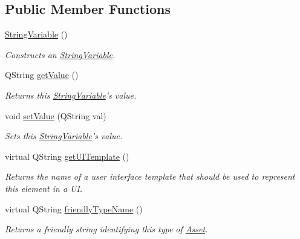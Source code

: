 \subsection*{Public Member Functions}
\begin{DoxyCompactItemize}
\item 
\hyperlink{class_picto_1_1_string_variable_a443c07562e5e21f5c1d72b5c5330303f}{String\-Variable} ()
\begin{DoxyCompactList}\small\item\em Constructs an \hyperlink{class_picto_1_1_string_variable}{String\-Variable}. \end{DoxyCompactList}\item 
\hypertarget{class_picto_1_1_string_variable_a533cc8e5eb63b0ea89f22e5e94f9f4ac}{Q\-String \hyperlink{class_picto_1_1_string_variable_a533cc8e5eb63b0ea89f22e5e94f9f4ac}{get\-Value} ()}\label{class_picto_1_1_string_variable_a533cc8e5eb63b0ea89f22e5e94f9f4ac}

\begin{DoxyCompactList}\small\item\em Returns this \hyperlink{class_picto_1_1_string_variable}{String\-Variable}'s value. \end{DoxyCompactList}\item 
\hypertarget{class_picto_1_1_string_variable_a0090c005a83026e90647fd27a6fb53f4}{void \hyperlink{class_picto_1_1_string_variable_a0090c005a83026e90647fd27a6fb53f4}{set\-Value} (Q\-String val)}\label{class_picto_1_1_string_variable_a0090c005a83026e90647fd27a6fb53f4}

\begin{DoxyCompactList}\small\item\em Sets this \hyperlink{class_picto_1_1_string_variable}{String\-Variable}'s value. \end{DoxyCompactList}\item 
\hypertarget{class_picto_1_1_string_variable_ad1f985a43f87f78dc92216cf03ffeadc}{virtual Q\-String \hyperlink{class_picto_1_1_string_variable_ad1f985a43f87f78dc92216cf03ffeadc}{get\-U\-I\-Template} ()}\label{class_picto_1_1_string_variable_ad1f985a43f87f78dc92216cf03ffeadc}

\begin{DoxyCompactList}\small\item\em Returns the name of a user interface template that should be used to represent this element in a U\-I. \end{DoxyCompactList}\item 
virtual Q\-String \hyperlink{class_picto_1_1_string_variable_ae14fdea0cf5e80dd976985208dc64fcc}{friendly\-Type\-Name} ()
\begin{DoxyCompactList}\small\item\em Returns a friendly string identifying this type of \hyperlink{class_picto_1_1_asset}{Asset}. \end{DoxyCompactList}\end{DoxyCompactItemize}
